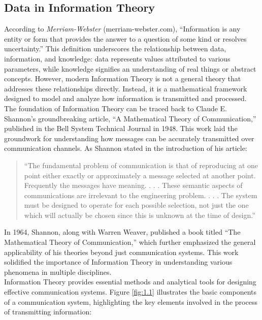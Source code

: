 \documentclass[12pt, oneside]{book}
\begin{document}
\subsection{Data in Information Theory}
According to \textit{Merriam-Webster} (merriam-webster.com), “Information is any entity or form that provides the answer to a question of some kind or resolves uncertainty.” This definition underscores the relationship between data, information, and knowledge: data represents values attributed to various parameters, while knowledge signifies an understanding of real things or abstract concepts. However, modern Information Theory is not a general theory that addresses these relationships directly. Instead, it is a mathematical framework designed to model and analyze how information is transmitted and processed.\\
The foundation of Information Theory can be traced back to Claude E. Shannon's groundbreaking article, “A Mathematical Theory of Communication,” published in the Bell System Technical Journal in 1948. This work laid the groundwork for understanding how messages can be accurately transmitted over communication channels. As Shannon stated in the introduction of his article:\\
\begin{quote}
	“The fundamental problem of communication is that of reproducing at one point either exactly or approximately a message selected at another point. Frequently the messages have meaning. . . . These semantic aspects of communications are irrelevant to the engineering problem. . . . The system must be designed to operate for each possible selection, not just the one which will actually be chosen since this is unknown at the time of design.”
\end{quote}
In 1964, Shannon, along with Warren Weaver, published a book titled “The Mathematical Theory of Communication,” which further emphasized the general applicability of his theories beyond just communication systems. This work solidified the importance of Information Theory in understanding various phenomena in multiple disciplines.\\
Information Theory provides essential methods and analytical tools for designing effective communication systems. Figure \ref{fig:1.1} illustrates the basic components of a communication system, highlighting the key elements involved in the process of transmitting information:\\
\end{document}
